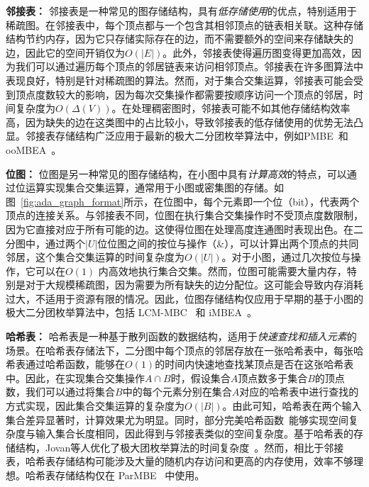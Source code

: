 \textbf{邻接表：} 邻接表是一种常见的图存储结构，具有\emph{低存储使用}的优点，特别适用于稀疏图。在邻接表中，每个顶点都与一个包含其相邻顶点的链表相关联。这种存储结构节约内存，因为它只存储实际存在的边，而不需要额外的空间来存储缺失的边，因此它的空间开销仅为$O(|E|)$。此外，邻接表使得遍历图变得更加高效，因为我们可以通过遍历每个顶点的邻居链表来访问相邻顶点。邻接表在许多图算法中表现良好，特别是针对稀疏图的算法。然而，对于集合交集运算，邻接表可能会受到顶点度数较大的影响，因为每次交集操作都需要按顺序访问一个顶点的邻居，时间复杂度为$O(\Delta(V))$。在处理稠密图时，邻接表可能不如其他存储结构效率高，因为缺失的边在这类图中的占比较小，导致邻接表的低存储使用的优势无法凸显。邻接表存储结构广泛应用于最新的极大二分团枚举算法中，例如PMBE~\cite{PMBE20}和ooMBEA~\cite{ooMBE22}。

\textbf{位图：} 位图是另一种常见的图存储结构，在小图中具有\emph{计算高效}的特点，可以通过位运算实现集合交集运算，通常用于小图或密集图的存储。如图~\ref{fig:ada_graph_format}所示，在位图中，每个元素即一个位（bit），代表两个顶点的连接关系。与邻接表不同，位图在执行集合交集操作时不受顶点度数限制，因为它直接对应于所有可能的边。这使得位图在处理高度连通图时表现出色。在二分图中，通过两个$|U|$位位图之间的按位与操作（\&），可以计算出两个顶点的共同邻居，这个集合交集运算的时间复杂度为$O(|U|)$。对于小图，通过几次按位与操作，它可以在$O(1)$ 内高效地执行集合交集。然而，位图可能需要大量内存，特别是对于大规模稀疏图，因为需要为所有缺失的边分配位。这可能会导致内存消耗过大，不适用于资源有限的情况。因此，位图存储结构仅应用于早期的基于小图的极大二分团枚举算法中，包括 LCM-MBC~\cite{lcmmbc07} 和 iMBEA~\cite{iMBEA14}。

\textbf{哈希表：} 哈希表是一种基于散列函数的数据结构，适用于\emph{快速查找和插入元素}的场景。在哈希表存储法下，二分图中每个顶点的邻居存放在一张哈希表中，每张哈希表通过哈希函数，能够在$O(1)$的时间内快速地查找某顶点是否在这张哈希表中。因此，在实现集合交集操作$A \cap B$时，假设集合$A$顶点数多于集合$B$的顶点数，我们可以通过将集合$B$中的每个元素分别在集合$A$对应的哈希表中进行查找的方式实现，因此集合交集运算的复杂度为$O(|B|)$。由此可知，哈希表在两个输入集合差异显著时，计算效果尤为明显。同时，部分完美哈希函数~\cite{cuckoohash04,murmurhash}能够实现空间复杂度与输入集合长度相同，因此得到与邻接表类似的空间复杂度。基于哈希表的存储结构，Jovan等人优化了极大团枚举算法的时间复杂度~\cite{MCE20}。然而，相比于邻接表，哈希表存储结构可能涉及大量的随机内存访问和更高的内存使用，效率不够理想。哈希表存储结构仅在 ParMBE~\cite{parMBE19} 中使用。



